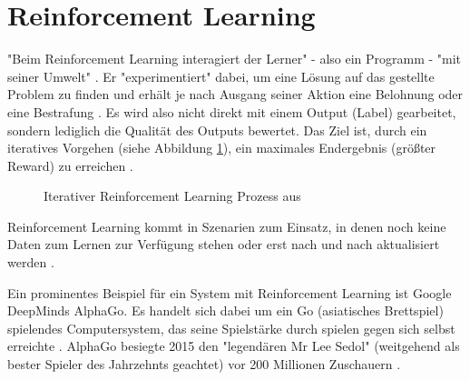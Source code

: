 \section{Reinforcement Learning}\label{sec:rl1}
"Beim Reinforcement Learning interagiert der Lerner" - also ein Programm - "mit seiner Umwelt" \citep[S.~45; eigene Übersetzung]{settles_active_2010}. Er "experimentiert" dabei, um eine Lösung auf das gestellte Problem zu finden und erhält je nach Ausgang seiner Aktion eine Belohnung oder eine Bestrafung \citep[S.~331]{kubat_introduction_2017}. Es wird also nicht direkt mit einem Output (Label) gearbeitet, sondern lediglich die Qualität des Outputs bewertet. Das Ziel ist, durch ein iteratives Vorgehen (siehe Abbildung \ref{fig:reinforcementLearning}), ein maximales Endergebnis (größter Reward) zu erreichen \citep[S.~69]{swamynathan_mastering_2017}.
\begin{figure}[H]
\centering
{}
\caption{Iterativer Reinforcement Learning Prozess aus \citep[S.~25]{lison_introduction_2012}}
\label{fig:reinforcementLearning}
\end{figure}
Reinforcement Learning kommt in Szenarien zum Einsatz, in denen noch keine Daten zum Lernen zur Verfügung stehen oder erst nach und nach aktualisiert werden \citep[S.~223]{ramasubramanian_machine_2017}.\par
Ein prominentes Beispiel für ein System mit Reinforcement Learning ist Google DeepMinds AlphaGo. Es handelt sich dabei um ein Go (asiatisches Brettspiel) spielendes Computersystem, das seine Spielstärke durch spielen gegen sich selbst erreichte \citep{silver_mastering_2017}. AlphaGo besiegte 2015 den "legendären Mr Lee Sedol" (weitgehend als bester Spieler des Jahrzehnts geachtet) vor 200 Millionen Zuschauern \citep{deepmind_alphago_2017}.

